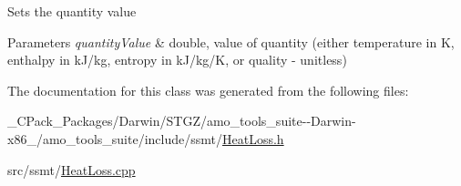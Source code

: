 Sets the quantity value 
\begin{DoxyParams}{Parameters}
{\em quantity\+Value} & double, value of quantity (either temperature in K, enthalpy in k\+J/kg, entropy in k\+J/kg/K, or quality -\/ unitless) \\
\hline
\end{DoxyParams}


The documentation for this class was generated from the following files\+:\begin{DoxyCompactItemize}
\item 
\+\_\+\+C\+Pack\+\_\+\+Packages/\+Darwin/\+S\+T\+G\+Z/amo\+\_\+tools\+\_\+suite-\/-\/\+Darwin-\/x86\+\_/amo\+\_\+tools\+\_\+suite/include/ssmt/\hyperlink{___c_pack___packages_2_darwin_2_s_t_g_z_2amo__tools__suite--_darwin-x86__64_2amo__tools__suite_2include_2ssmt_2_heat_loss_8h}{Heat\+Loss.\+h}\item 
src/ssmt/\hyperlink{_heat_loss_8cpp}{Heat\+Loss.\+cpp}\end{DoxyCompactItemize}
